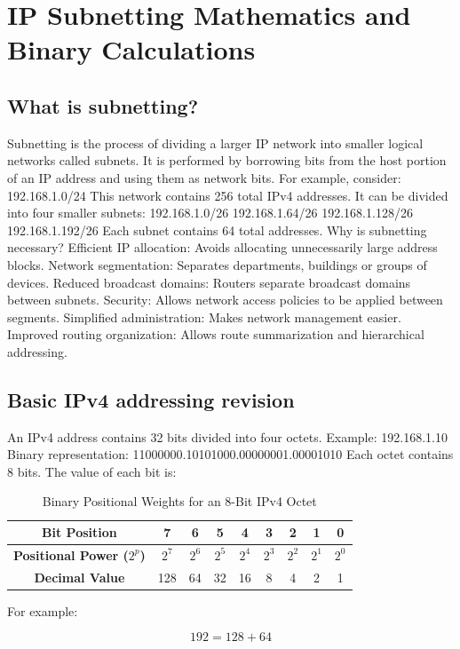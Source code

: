 \section{IP Subnetting Mathematics and Binary Calculations}

\subsection{What is subnetting?}
Subnetting is the process of dividing a larger IP network into smaller logical networks called subnets.
It is performed by borrowing bits from the host portion of an IP address and using them as network bits.
For example, consider:
192.168.1.0/24
This network contains 256 total IPv4 addresses.
It can be divided into four smaller subnets:
192.168.1.0/26
192.168.1.64/26
192.168.1.128/26
192.168.1.192/26
Each subnet contains 64 total addresses.
Why is subnetting necessary?
Efficient IP allocation: Avoids allocating unnecessarily large address blocks.
Network segmentation: Separates departments, buildings or groups of devices.
Reduced broadcast domains: Routers separate broadcast domains between subnets.
Security: Allows network access policies to be applied between segments.
Simplified administration: Makes network management easier.
Improved routing organization: Allows route summarization and hierarchical addressing.
\subsection{Basic IPv4 addressing revision}
An IPv4 address contains 32 bits divided into four octets.
Example:
192.168.1.10
Binary representation:
11000000.10101000.00000001.00001010
Each octet contains 8 bits.
The value of each bit is:
\begin{table}[htbp]
\centering
\caption{Binary Positional Weights for an 8-Bit IPv4 Octet}
\label{tab:ipv4_octet_weights}
\begin{tabular}{ccccccccc}
\toprule
\textbf{Bit Position} & 7 & 6 & 5 & 4 & 3 & 2 & 1 & 0 \\
\midrule
\textbf{Positional Power ($2^p$)} & $2^7$ & $2^6$ & $2^5$ & $2^4$ & $2^3$ & $2^2$ & $2^1$ & $2^0$ \\
\textbf{Decimal Value} & 128 & 64 & 32 & 16 & 8 & 4 & 2 & 1 \\
\bottomrule
\end{tabular}
\end{table}
For example:

\[
192=128+64
\]

